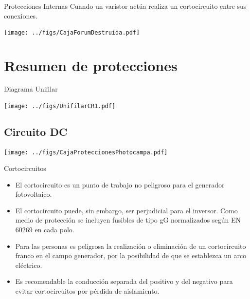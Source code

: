 \documentclass[aspectratio=169, usenames,svgnames,dvipsnames]{beamer}
\begin{document}
\begin{frame}[label={sec:orge9cc7bc}]{Protecciones Internas}
Cuando un varistor actúa realiza un cortocircuito entre sus conexiones.
\begin{center}
\texttt{[image: ../figs/CajaForumDestruida.pdf]}
\end{center}
\end{frame}

\section{Resumen de protecciones}
\label{sec:org35dad26}

\begin{frame}[label={sec:orgdcc9ef8},plain]{Diagrama Unifilar}
\begin{center}
\texttt{[image: ../figs/UnifilarCR1.pdf]}
\end{center}
\end{frame}

\subsection{Circuito DC}
\label{sec:orgdb31808}
\begin{frame}[label={sec:org31b2454}]{}
\begin{center}
\texttt{[image: ../figs/CajaProteccionesPhotocampa.pdf]}
\end{center}
\end{frame}


\begin{frame}[label={sec:org27b3fda}]{Cortocircuitos}
\begin{itemize}
\item El \alert{cortocircuito} es un punto de trabajo \alert{no peligroso para el
generador fotovoltaico}.

\item El cortocircuito puede, sin embargo, ser \alert{perjudicial para el
inversor}. Como medio de protección se incluyen fusibles de tipo gG
normalizados según EN 60269 en cada polo.

\item Para las personas es \alert{peligrosa la realización o eliminación de un
cortocircuito franco en el campo generador}, por la posibilidad de
que se establezca un arco eléctrico.

\item Es recomendable la \alert{conducción separada} del positivo y del negativo
para evitar cortocircuitos por pérdida de aislamiento.
\end{itemize}
\end{frame}
\end{document}
